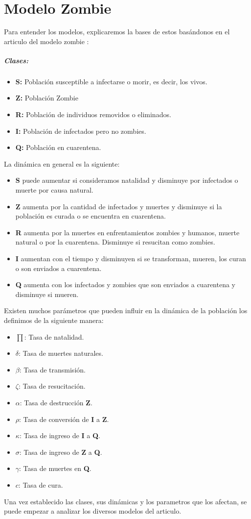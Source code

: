 \documentclass[12pt]{article}
\begin{document}
\section{Modelo Zombie}
Para entender los modelos, explicaremos la bases de estos basándonos en el articulo del modelo zombie \cite{Manual}:
\subparagraph{Clases:}
\begin{itemize}
	\item \textbf{S:} Población susceptible a infectarse o morir, es decir, los vivos.
	\item \textbf{Z:} Población Zombie
	\item \textbf{R:} Población de individuos removidos o eliminados.
	\item \textbf{I:} Población de infectados pero no zombies.
	\item \textbf{Q:} Población en cuarentena.
\end{itemize}
La dinámica en general es la siguiente:
\begin{itemize}
	\item \textbf{S} puede aumentar si consideramos natalidad y disminuye por infectados o muerte por causa natural.
	\item \textbf{Z} aumenta por la cantidad de infectados y muertes y disminuye si la población es curada o se encuentra en cuarentena.
	\item \textbf{R} aumenta por la muertes en enfrentamientos zombies y humanos, muerte natural o por la cuarentena. Disminuye si resucitan como zombies.
	\item \textbf{I} aumentan con el tiempo y disminuyen si se transforman, mueren, los curan o son enviados a cuarentena.
	\item \textbf{Q} aumenta con los infectados y zombies que son enviados a cuarentena y disminuye si mueren.
\end{itemize}

Existen muchos parámetros que pueden influir en la dinámica de la población los definimos de la siguiente manera:

\begin{itemize}
	\item $\prod$: Tasa de natalidad.
	\item $\delta$: Tasa de muertes naturales.
	\item $\beta$: Tasa de transmisión.
	\item $\zeta$: Tasa de resucitación.
	\item $\alpha$: Tasa de destrucción \textbf{Z}.
	\item $\rho$: Tasa de conversión de \textbf{I} a \textbf{Z}.
	\item $\kappa$: Tasa de ingreso de \textbf{I} a \textbf{Q}.
	\item $\sigma$: Tasa de ingreso de \textbf{Z} a \textbf{Q}.
	\item $\gamma$: Tasa de muertes en \textbf{Q}.
	\item $c$: Tasa de cura.
\end{itemize}
Una vez establecido las clases, sus dinámicas y los parametros que los afectan, se puede empezar a analizar los diversos modelos del articulo.
\end{document}
